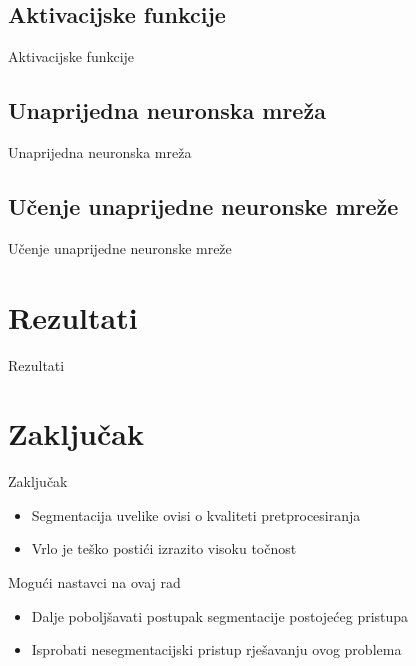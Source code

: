 \documentclass{beamer}
\begin{document}
    \subsection{Aktivacijske funkcije}
        \begin{frame}{Aktivacijske funkcije}
            
        \end{frame}
    
    \subsection{Unaprijedna neuronska mreža}
        \begin{frame}{Unaprijedna neuronska mreža}
            
        \end{frame}
    
    \subsection{Učenje unaprijedne neuronske mreže}
        \begin{frame}{Učenje unaprijedne neuronske mreže}
            
        \end{frame}

\section{Rezultati}	
	\begin{frame}{Rezultati}
		
	\end{frame}


\section{Zaključak}
	\begin{frame}{Zaključak}
		\begin{itemize}
			\item Segmentacija uvelike ovisi o kvaliteti pretprocesiranja
			\smallskip
			\item Vrlo je teško postići izrazito visoku točnost
		\end{itemize}
		
		\bigskip		
		\pause		
		
		\begin{block}{Mogući nastavci na ovaj rad}
			\begin{itemize}
				\item Dalje poboljšavati postupak segmentacije postojećeg pristupa
				\item Isprobati nesegmentacijski pristup rješavanju ovog problema
			\end{itemize}
		\end{block}
	\end{frame}
\end{document}
